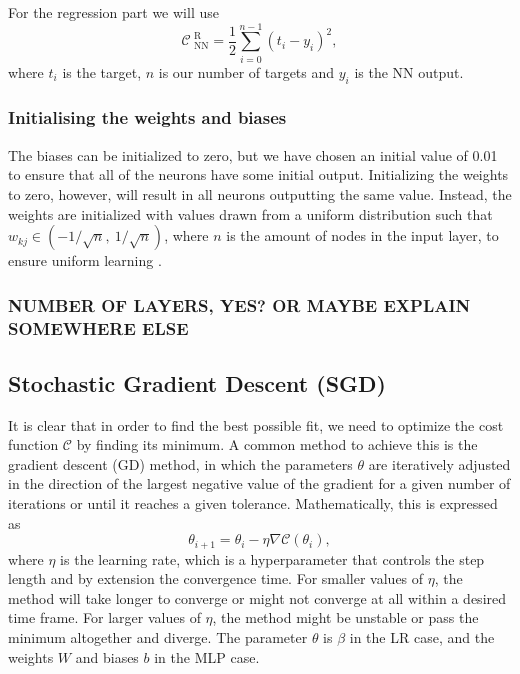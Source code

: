 \documentclass[a4paper, 11pt, twocolumn]{article}
\begin{document}
For the regression part we will use
\begin{equation}
\mathcal{C}_\text{ NN}^\text{ R} = \frac{1}{2}\sum_{i=0}^{n-1}(t_i-y_i)^2,
\end{equation}
where $t_i$ is the target, $n$ is our number of targets and $y_i$ is the NN output. 

\subsubsection{Initialising  the weights and biases}	
The biases can be initialized to zero, but we have chosen an initial value of 0.01 
to ensure that all of the neurons have some initial output. Initializing the 
weights to zero, however, will result in all neurons outputting the same value. 
Instead, the  weights are initialized with values drawn from a uniform distribution 
such that $w_{kj}\in (-1/\sqrt{n}, \ 1/\sqrt{n})$, where $n$ is the amount of 
nodes in the input layer,  to ensure uniform learning \cite{ML_algo}.

\subsubsection{NUMBER OF LAYERS, YES? OR MAYBE EXPLAIN SOMEWHERE ELSE}
\subsection{Stochastic Gradient Descent (SGD)}
It is clear that in order to find the best possible fit, we need to optimize the 
cost function $\mathcal{C}$ by finding its minimum. A common method to achieve 
this is the gradient descent (GD) method, in which the parameters $\theta$ are 
iteratively adjusted in the direction of the largest negative value of the 
gradient for a given number of iterations or until it reaches a given tolerance. 
Mathematically, this is expressed as
\begin{equation}
\theta_{i+1} = \theta_i -\eta \nabla \mathcal{C}(\theta_i),
\end{equation}
where $\eta$ is the learning rate, which is a hyperparameter that controls the 
step length and by extension the convergence time. For smaller values of $\eta$, 
the method will take longer to converge or might not converge at all within a 
desired time frame. For larger values of $\eta$, the method might be unstable or 
pass the minimum altogether and diverge. The parameter $\theta$ is $\beta$ in 
the LR case, and the weights $W$ and biases $b$ in the MLP case.
\end{document}
